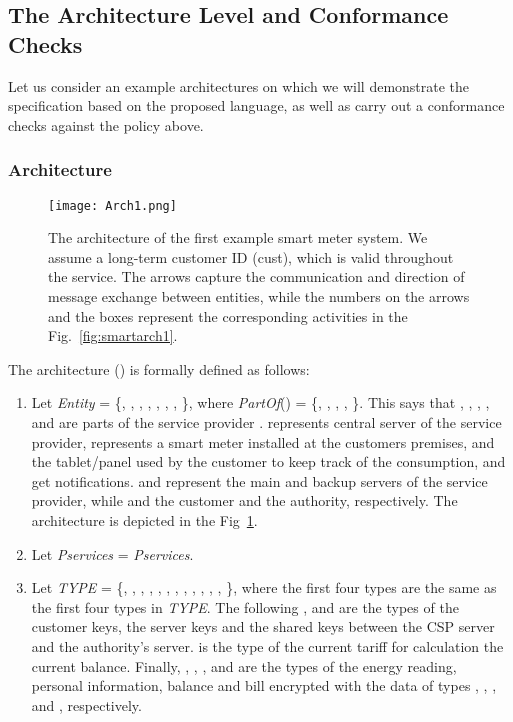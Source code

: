 \documentclass[a4paper]{article}
\begin{document}
\subsection{The Architecture Level and Conformance Checks} 
\label{arch:smartmeter}

Let us consider an example architectures on which we will demonstrate  the specification based on the proposed language, as well as carry out a conformance checks against the policy above.

\subsubsection{Architecture} 
\label{smartarch1} 

\begin{figure}[htb!]
    \begin{center}
        \texttt{[image: Arch1.png]}
    \end{center}
    \caption{The architecture of the first example smart meter system. We assume a long-term  customer ID (cust), which is valid throughout the service. The arrows capture the communication and direction of message exchange between entities, while the numbers on the arrows and the boxes represent the corresponding activities in the Fig.~\ref{fig:smartarch1}.}
    \label{fig:smartmeter1}
\end{figure}
 
The architecture () is formally defined as follows:  

\begin{enumerate}
\item Let \textit{Entity} = \{, , , , , , , \}, where 
 \textit{PartOf}() = \{, , , , \}. This says that  , , , , and  are parts of the service provider .  represents central server of the service provider,  represents a smart meter installed at the customers premises, and  the tablet/panel used by the customer to keep track of the consumption, and get notifications.  and   represent the main and backup servers of the service provider, while  and  the customer and the authority, respectively. The architecture is depicted in the Fig~\ref{fig:smartmeter1}.
 
\item Let \textit{Pservices} = \textit{Pservices}.

\item Let  \textit{TYPE} = \{, , , , , , , , , ,  , , \}, where the first four types are the same as the first four types in \textit{ TYPE}. The following  ,  and  are the types of the customer keys, the server keys and the shared keys between the CSP server and the authority's server.  is the type of the current tariff for calculation the current balance. Finally, , ,  ,  and  are the types of the energy reading, personal information, balance and bill encrypted with the data of types , , ,  and , respectively.
\end{enumerate}
\end{document}

